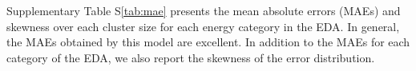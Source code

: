 \documentclass[12pt,letter]{article}
\begin{document}
Supplementary Table S\ref{tab:mae} presents the mean absolute errors (MAEs) and skewness over each cluster size for each energy category in the EDA. %
In general, the MAEs obtained by this model are excellent. In addition to the MAEs for each category of the EDA, we also report the skewness of the error distribution. %
\end{document}
